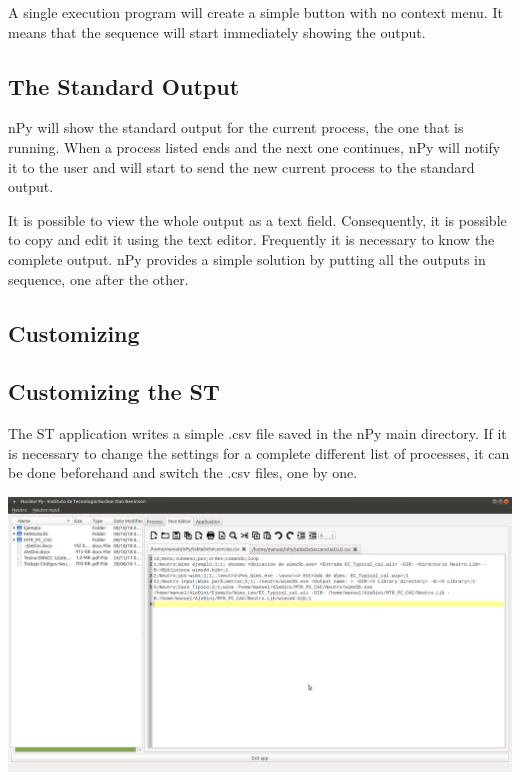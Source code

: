 \documentclass[a4paper,10pt]{article}
\begin{document}
A single execution program will create a simple button with no context menu. It means that the sequence will start immediately showing the output.

\subsection{The Standard Output}

nPy will show the standard output for the current process, the one that is running. When a process listed ends and the next one continues, nPy will notify it to the user and will start to send the new current process to the standard output.

It is possible to view the whole output as a text field. Consequently, it is possible to copy and edit it using the text editor. Frequently it is necessary to know the complete output. nPy provides a simple solution by putting all the outputs in sequence, one after the other.

\subsection{Customizing}

\subsection{Customizing the ST}

The ST application writes a simple .csv file saved in the nPy main directory. If it is necessary to change the settings for a complete different list of processes, it can be done beforehand and switch the .csv files, one by one.

\begin{center}
 \includegraphics[width=\textwidth]{img/tablaDeSecuenciasConfig.png}
\end{center}
\end{document}
